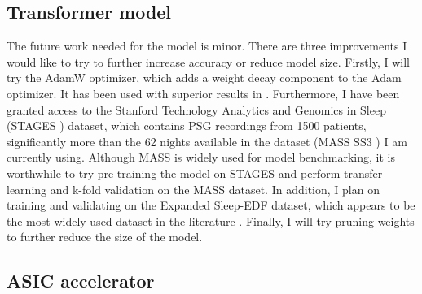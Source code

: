\documentclass[12pt]{article}
\begin{document}
    \subsection{Transformer model}
    The future work needed for the model is minor. There are three improvements I would like to try to further increase accuracy or reduce model size. Firstly, I will try the AdamW optimizer, which adds a weight decay component to the Adam optimizer. It has been used with superior results
    in \cite*{dai2023multichannelsleepnet}. Furthermore, I have been  granted access to the Stanford Technology Analytics and Genomics in Sleep (STAGES \cite*{zhang2018national}) dataset, which contains PSG recordings from 1500 patients, significantly more than the 62 nights available in
    the dataset (MASS SS3 \cite*{SP3/9MYUCS_2022}) I am currently using. Although MASS is widely used for model benchmarking, it is worthwhile to try pre-training the model on STAGES and perform transfer learning and k-fold validation on the MASS dataset. In addition, I plan on training
    and validating on the Expanded Sleep-EDF dataset, which appears to be the most widely used dataset in the literature \cite*{physiobank2000physionet}. Finally, I will try pruning weights to further reduce the size of the model.

    \subsection{ASIC accelerator}
\end{document}
